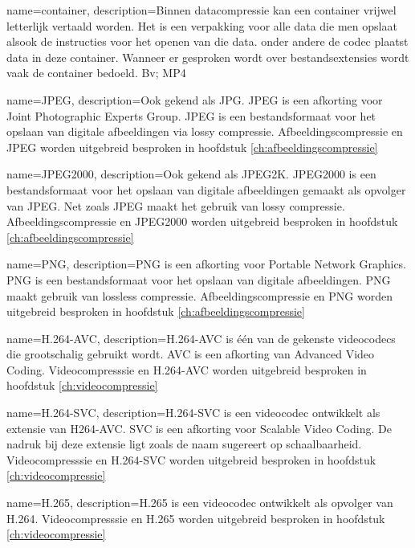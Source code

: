 {
	name={container},
	description={Binnen datacompressie kan een container vrijwel letterlijk vertaald worden. Het is een verpakking voor alle data die men opslaat alsook de instructies voor het openen van die data. onder andere de codec plaatst data in deze container. Wanneer er gesproken wordt over bestandsextensies wordt vaak de container bedoeld. Bv; MP4 }
}

{
	name={JPEG},
	description={Ook gekend als JPG. JPEG is een afkorting voor Joint Photographic Experts Group. JPEG is een bestandsformaat voor het opslaan van digitale afbeeldingen via lossy compressie. Afbeeldingscompressie en JPEG worden uitgebreid besproken in hoofdstuk \ref{ch:afbeeldingscompressie}}
}

{
	name={JPEG2000},
	description={Ook gekend als JPEG2K. JPEG2000 is een bestandsformaat voor het opslaan van digitale afbeeldingen gemaakt als opvolger van JPEG. Net zoals JPEG maakt het gebruik van lossy compressie. Afbeeldingscompressie en JPEG2000 worden uitgebreid besproken in hoofdstuk \ref{ch:afbeeldingscompressie}}
}

{
	name={PNG},
	description={PNG is een afkorting voor Portable Network Graphics. PNG is een bestandsformaat voor het opslaan van digitale afbeeldingen. PNG maakt gebruik van lossless compressie. Afbeeldingscompressie en PNG worden uitgebreid besproken in hoofdstuk \ref{ch:afbeeldingscompressie}}
}

{
	name={H.264-AVC},
	description={H.264-AVC is één van de gekenste videocodecs die grootschalig gebruikt wordt. AVC is een afkorting van Advanced Video Coding. Videocompresssie en H.264-AVC worden uitgebreid besproken in hoofdstuk \ref{ch:videocompressie}}
}

{
	name={H.264-SVC},
	description={H.264-SVC is een videocodec ontwikkelt als extensie van H264-AVC. SVC is een afkorting voor Scalable Video Coding. De nadruk bij deze extensie ligt zoals de naam sugereert op schaalbaarheid. Videocompresssie en H.264-SVC worden uitgebreid besproken in hoofdstuk \ref{ch:videocompressie}}
}

{
	name={H.265},
	description={H.265 is een videocodec ontwikkelt als opvolger van H.264. Videocompresssie en H.265 worden uitgebreid besproken in hoofdstuk \ref{ch:videocompressie}}
}

